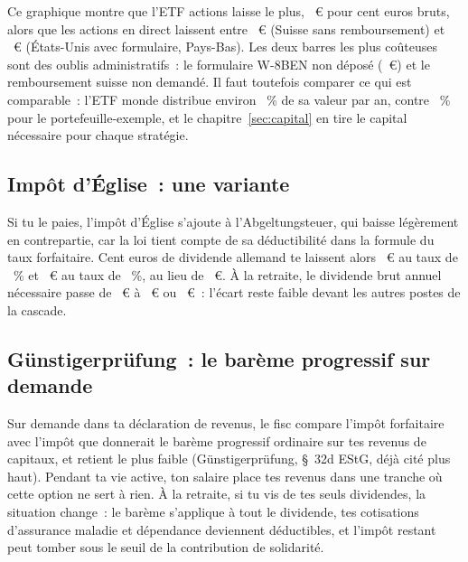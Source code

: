 Ce graphique montre que l'ETF actions laisse le plus, \NettoEtf~€ pour cent euros bruts, alors que les
actions en direct laissent entre \NettoCh~€ (Suisse sans remboursement) et \NettoUs~€ (\'Etats-Unis
avec formulaire, Pays-Bas). Les deux barres les plus coûteuses sont des oublis administratifs~: le
formulaire W-8BEN non d\'epos\'e (\NettoUsSansFormulaire~€) et le remboursement suisse non demand\'e.
Il faut toutefois comparer ce qui est comparable~: l'ETF monde distribue environ \RenditeDivEtf~\% de sa
valeur par an, contre \RenditeDivMaison~\% pour le portefeuille-exemple, et le chapitre~\ref{sec:capital} en tire le
capital n\'ecessaire pour chaque strat\'egie.

\subsection{Imp\^ot d'\'Eglise~: une variante}\label{sec:fisc-kirchensteuer}


Si tu le paies, l'imp\^ot d'\'Eglise s'ajoute \`a l'Abgeltungsteuer, qui baisse l\'eg\`erement en
contrepartie, car la loi tient compte de sa d\'eductibilit\'e dans la formule du taux forfaitaire.
Cent euros de dividende allemand te laissent alors \NettoDeKistAcht~€ au taux de \KistAcht~\% et
\NettoDeKistNeun~€ au taux de \KistNeun~\%, au lieu de \NettoDe~€. \`A la retraite, le dividende brut
annuel n\'ecessaire passe de \BruttoNoetig~€ \`a \BruttoNoetigKistAcht~€ ou \BruttoNoetigKistNeun~€~:
l'\'ecart reste faible devant les autres postes de la cascade.

\subsection{G\"unstigerpr\"ufung~: le bar\`eme progressif sur demande}\label{sec:fisc-guenstiger}

Sur demande dans ta d\'eclaration de revenus, le fisc compare l'imp\^ot forfaitaire avec l'imp\^ot
que donnerait le bar\`eme progressif ordinaire sur tes revenus de capitaux, et retient le plus faible
(G\"unstigerpr\"ufung, \S~32d EStG, d\'ej\`a cit\'e plus haut). Pendant ta vie active, ton salaire
place tes revenus dans une tranche o\`u cette option ne sert \`a rien. \`A la retraite, si tu vis de
tes seuls dividendes, la situation change~: le bar\`eme s'applique \`a tout le dividende, tes
cotisations d'assurance maladie et d\'ependance deviennent d\'eductibles, et l'imp\^ot restant peut
tomber sous le seuil de la contribution de solidarit\'e.

